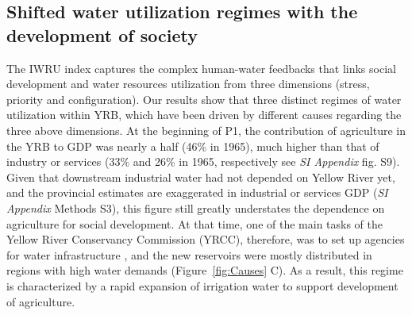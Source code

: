 \documentclass[9pt, twocolumn, twoside, lineno]{pnas-new}
\begin{document}
\subsection*{Shifted water utilization regimes with the development of society}
The IWRU index captures the complex human-water feedbacks that links social development and water resources utilization from three dimensions (stress, priority and configuration). 
Our results show that three distinct regimes of water utilization within YRB, which have been driven by different causes regarding the three above dimensions.
At the beginning of P1, the contribution of agriculture in the YRB to GDP was nearly a half (46\% in 1965), much higher than that of industry or services (33\% and 26\% in 1965, respectively see \textit{SI Appendix} fig. S9). 
Given that downstream industrial water had not depended on Yellow River yet, and the provincial estimates are exaggerated in industrial or services GDP (\textit{SI Appendix} Methods S3), this figure still greatly understates the dependence on agriculture for social development.
At that time, one of the main tasks of the Yellow River Conservancy Commission (YRCC), therefore, was to set up agencies for water infrastructure \cite{yellowriverarchivesOrganizationalHistoryYellow2004}, and the new reservoirs were mostly distributed in regions with high water demands (Figure~\ref{fig:Causes} C). 
As a result, this regime is characterized by a rapid expansion of irrigation water to support development of agriculture.
\end{document}
